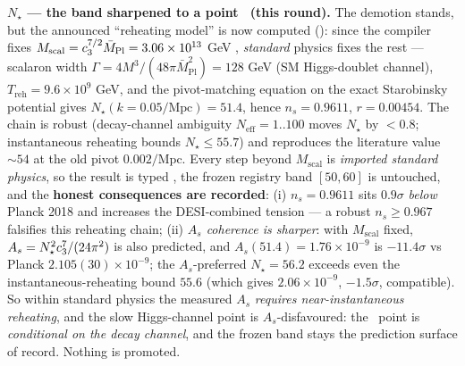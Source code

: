 \smallskip\noindent\textbf{$N_\star$ --- the band sharpened to a point \mC\ (this round).} The demotion
stands, but the announced ``reheating model'' is now computed (): since the
compiler fixes $M_{\mathrm{scal}}=c_3^{7/2}\bar M_{\mathrm{Pl}}=3.06\times10^{13}$ GeV \mE,
\emph{standard} physics fixes the rest --- scalaron width
$\Gamma=4M^3/(48\pi\bar M_{\mathrm{Pl}}^2)=128$ GeV (SM Higgs-doublet channel),
$T_{\mathrm{reh}}=9.6\times10^{9}$ GeV, and the pivot-matching equation on the exact Starobinsky potential
gives $\boxed{N_\star(k{=}0.05/\mathrm{Mpc})=51.4}$, hence $n_s=0.9611$, $r=0.00454$. The chain is robust
(decay-channel ambiguity $N_{\mathrm{eff}}{=}1..100$ moves $N_\star$ by $<0.8$; instantaneous reheating
bounds $N_\star\le55.7$) and reproduces the literature value $\sim54$ at the old pivot $0.002/\mathrm{Mpc}$.
Every step beyond $M_{\mathrm{scal}}$ is \emph{imported standard physics}, so the result is typed \mC, the
frozen registry band $[50,60]$ is untouched, and the \textbf{honest consequences are recorded}:
(i) $n_s=0.9611$ sits $0.9\sigma$ \emph{below} Planck 2018 and increases the DESI-combined tension --- a
robust $n_s\ge0.967$ falsifies this reheating chain; (ii) \emph{$A_s$ coherence is sharper}: with
$M_{\mathrm{scal}}$ fixed, $A_s=N_\star^2c_3^7/(24\pi^2)$ is also predicted, and
$A_s(51.4)=1.76\times10^{-9}$ is $-11.4\sigma$ vs Planck $2.105(30)\times10^{-9}$; the $A_s$-preferred
$N_\star=56.2$ exceeds even the instantaneous-reheating bound $55.6$ (which gives $2.06\times10^{-9}$,
$-1.5\sigma$, compatible). So within standard physics the measured $A_s$ \emph{requires near-instantaneous
reheating}, and the slow Higgs-channel point is $A_s$-disfavoured: the \mC\ point is \emph{conditional on
the decay channel}, and the frozen band stays the prediction surface of record. Nothing is promoted.

